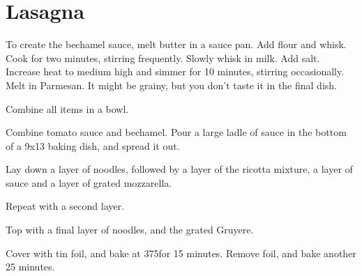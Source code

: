 
\section{Lasagna}
\begin{recipe}


To create the bechamel sauce, melt butter in a sauce pan. Add flour and whisk. Cook for two minutes, stirring frequently. Slowly whisk in milk. Add salt. Increase heat to medium high and simmer for 10 minutes, stirring occasionally. Melt in Parmesan. It might be grainy, but you don't taste it in the final dish.


Combine all items in a bowl.


Combine tomato sauce and bechamel. Pour a large ladle of sauce in the bottom of a 9x13 baking dish, and spread it out.

Lay down a layer of noodles, followed by a layer of the ricotta mixture, a layer of sauce and a layer of grated mozzarella.

Repeat with a second layer.


Top with a final layer of noodles, and the grated Gruyere.

Cover with tin foil, and bake at 375\degree for 15 minutes. Remove foil, and bake another 25 minutes.


\end{recipe}
